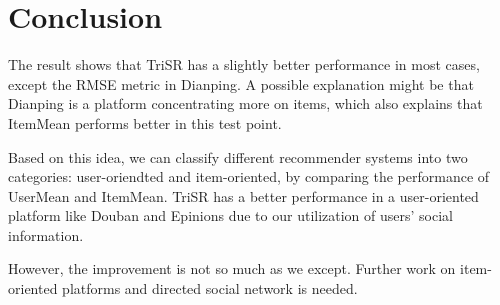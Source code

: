 \documentclass{article}
\begin{document}
\section{Conclusion}
\label{conclusion}
The result shows that TriSR has a slightly better performance in most cases, except 
the RMSE metric in Dianping. A possible explanation might be that Dianping is a platform 
concentrating more on items, which also explains that ItemMean performs better in this test point. 

Based on this idea, we can classify different recommender systems into two categories: 
user-oriendted and item-oriented, by comparing the performance of UserMean and ItemMean.
TriSR has a better performance in a user-oriented platform like Douban and Epinions due to
our utilization of users' social information.

However, the improvement is not so much as we except. Further work on item-oriented 
platforms and directed social network is needed. 



\end{document}

